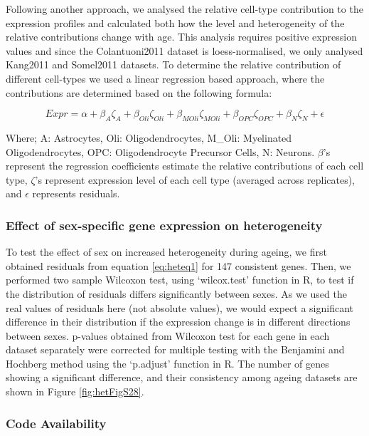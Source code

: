 \documentclass[12pt,twoside]{unicam}
\begin{document}
Following another approach, we analysed the relative cell-type contribution to the expression profiles and calculated both how the level and heterogeneity of the relative contributions change with age. This analysis requires positive expression values and since the Colantuoni2011 dataset is loess-normalised, we only analysed Kang2011 and Somel2011 datasets. To determine the relative contribution of different cell-types we used a linear regression based approach, where the contributions are determined based on the following formula:

\begin{equation}
    Expr = \alpha + \beta_{A}\zeta_{A} + \beta_{Oli}\zeta_{Oli} + \beta_{MOli}\zeta_{MOli} + \beta_{OPC}\zeta_{OPC} + \beta_{N}\zeta_{N} + \epsilon
  \label{eq:heteq2}
\end{equation}

Where; A: Astrocytes, Oli: Oligodendrocytes, M\_Oli: Myelinated Oligodendrocytes, OPC: Oligodendrocyte Precursor Cells, N: Neurons. \(\beta\)'s represent the regression coefficients estimate the relative contributions of each cell type, \(\zeta\)'s represent expression level of each cell type (averaged across replicates), and \(\epsilon\) represents residuals.

\hypertarget{effect-of-sex-specific-gene-expression-on-heterogeneity}{%
\subsubsection{Effect of sex-specific gene expression on heterogeneity}\label{effect-of-sex-specific-gene-expression-on-heterogeneity}}

To test the effect of sex on increased heterogeneity during ageing, we first obtained residuals from equation \eqref{eq:heteq1} for 147 consistent genes. Then, we performed two sample Wilcoxon test, using `wilcox.test' function in R, to test if the distribution of residuals differs significantly between sexes. As we used the real values of residuals here (not absolute values), we would expect a significant difference in their distribution if the expression change is in different directions between sexes. p-values obtained from Wilcoxon test for each gene in each dataset separately were corrected for multiple testing with the Benjamini and Hochberg method using the `p.adjust' function in R. The number of genes showing a significant difference, and their consistency among ageing datasets are shown in Figure \ref{fig:hetFigS28}.

\hypertarget{code-availability}{%
\subsubsection{Code Availability}\label{code-availability}}
\end{document}

